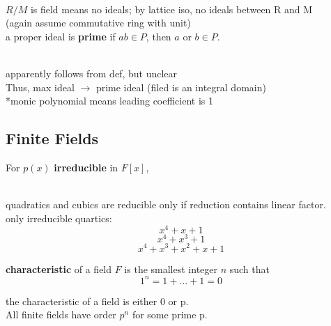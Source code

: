 \documentclass[12pt]{article}
\begin{document}
\centerline{}\\
\textcolor[gray]{0.5}{$R / M$ is field means no ideals; by lattice iso, no ideals between R and M}\\

(again assume commutative ring with unit)\\
a proper ideal is \textbf{prime} if $ab \in P$, then $a$ or $b \in P$.\\

\centerline{}\\

\textcolor[gray]{0.5}{apparently follows from def, but unclear} \\

Thus, max ideal $\rightarrow$ prime ideal (filed is an integral domain)\\

*monic polynomial means leading coefficient is 1

\subsection*{Finite Fields}

For $p(x)$ \textbf{irreducible} in $F[x]$, \\
\ \\
\centerline{}

quadratics and cubics are reducible only if reduction contains linear factor. \\

only irreducible quartics: \\
$$x^4 + x + 1$$
$$x^4 + x^3 + 1$$
$$x^4 + x^3 + x^2 + x + 1$$

\textbf{characteristic} of a field $F$ is the smallest integer $n$ such that 
$$1^n = 1 + ... + 1 = 0$$

the characteristic of a field is either 0 or p.\\

All finite fields have order $p^n$ for some prime p.
\end{document}
